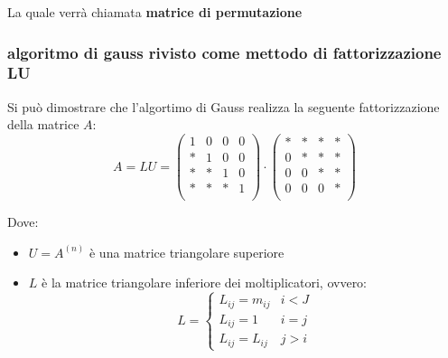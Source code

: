 La quale verrà chiamata \textbf{matrice di permutazione}

\subsubsection{algoritmo di gauss rivisto come mettodo di fattorizzazione LU}
Si può dimostrare che l'algortimo di Gauss realizza la seguente fattorizzazione della matrice $A$:
\[
    A = LU = \begin{pmatrix}
    1 & 0 & 0 & 0\\
    * & 1 & 0 & 0\\
    * & * & 1 & 0\\
    * & * & * & 1\\
    \end{pmatrix} \cdot \begin{pmatrix}
    * & * & * & *\\
    0 & * & * & *\\
    0 & 0 & * & *\\
    0 & 0 & 0 & *\\
    \end{pmatrix}
\]

Dove:
\begin{itemize}
    \item $U=A^{(n)}$ è una matrice triangolare superiore
    \item $L$ è la matrice triangolare inferiore dei moltiplicatori, ovvero:
    \[
        L = \begin{cases}
            L_{ij} = m_{ij} & i<J\\
            L_{ij} = 1 & i=j\\
            L_{ij} = L_{ij} & j>i
        \end{cases}    
    \]
\end{itemize}


